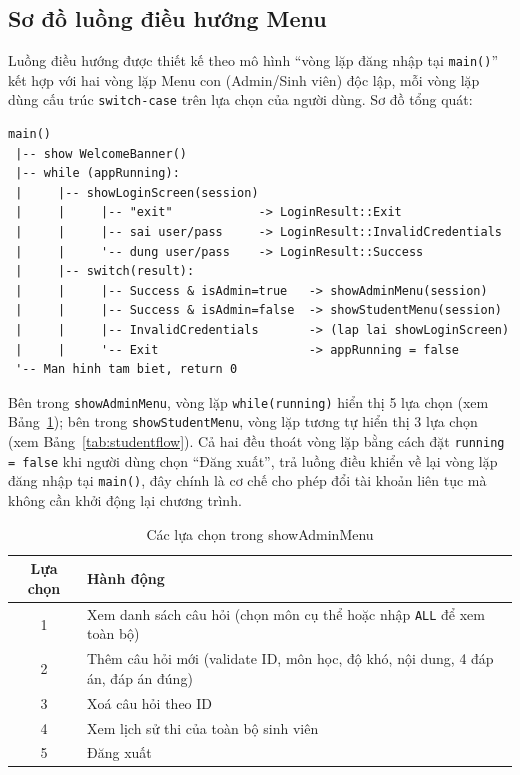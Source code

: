 \documentclass[11pt]{report}
\begin{document}
\subsection{Sơ đồ luồng điều hướng Menu}

Luồng điều hướng được thiết kế theo mô hình ``vòng lặp đăng nhập tại \texttt{main()}'' kết hợp với hai vòng lặp Menu con (Admin/Sinh viên) độc lập, mỗi vòng lặp dùng cấu trúc \texttt{switch-case} trên lựa chọn của người dùng. Sơ đồ tổng quát:

\begin{verbatim}
main()
 |-- show WelcomeBanner()
 |-- while (appRunning):
 |     |-- showLoginScreen(session)
 |     |     |-- "exit"            -> LoginResult::Exit
 |     |     |-- sai user/pass     -> LoginResult::InvalidCredentials
 |     |     '-- dung user/pass    -> LoginResult::Success
 |     |-- switch(result):
 |     |     |-- Success & isAdmin=true   -> showAdminMenu(session)
 |     |     |-- Success & isAdmin=false  -> showStudentMenu(session)
 |     |     |-- InvalidCredentials       -> (lap lai showLoginScreen)
 |     |     '-- Exit                     -> appRunning = false
 '-- Man hinh tam biet, return 0
\end{verbatim}

Bên trong \texttt{showAdminMenu}, vòng lặp \texttt{while(running)} hiển thị 5 lựa chọn (xem Bảng~\ref{tab:adminflow}); bên trong \texttt{showStudentMenu}, vòng lặp tương tự hiển thị 3 lựa chọn (xem Bảng~\ref{tab:studentflow}). Cả hai đều thoát vòng lặp bằng cách đặt \texttt{running = false} khi người dùng chọn ``Đăng xuất'', trả luồng điều khiển về lại vòng lặp đăng nhập tại \texttt{main()}, đây chính là cơ chế cho phép đổi tài khoản liên tục mà không cần khởi động lại chương trình.

\begin{table}[H]
    \centering
    \begin{tabularx}{\textwidth}{|c|X|} \hline
        \textbf{Lựa chọn} & \textbf{Hành động} \\ \hline
        1 & Xem danh sách câu hỏi (chọn môn cụ thể hoặc nhập \texttt{ALL} để xem toàn bộ) \\ \hline
        2 & Thêm câu hỏi mới (validate ID, môn học, độ khó, nội dung, 4 đáp án, đáp án đúng) \\ \hline
        3 & Xoá câu hỏi theo ID \\ \hline
        4 & Xem lịch sử thi của toàn bộ sinh viên \\ \hline
        5 & Đăng xuất \\ \hline
    \end{tabularx}
    \caption{Các lựa chọn trong showAdminMenu}
    \label{tab:adminflow}
\end{table}
\end{document}
